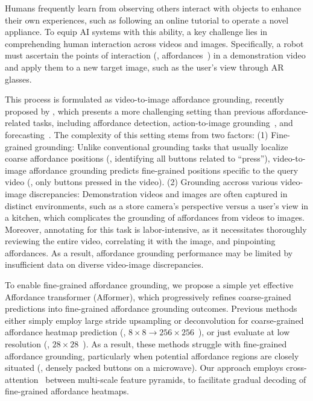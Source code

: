 \documentclass[10pt,twocolumn,letterpaper]{article}
\begin{document}
Humans frequently learn from observing others interact with objects to enhance their own experiences, such as following an online tutorial to operate a novel appliance. To equip AI systems with this ability, a key challenge lies in comprehending human interaction across videos and images. Specifically, a robot must ascertain the points of interaction (\ie, affordances~\cite{affo_survey}) in a demonstration video and apply them to a new target image, such as the user's view through AR glasses.

This process is formulated as video-to-image affordance grounding, recently proposed by \cite{demo2vec}, which presents a more challenging setting than previous affordance-related tasks, including affordance detection\cite{affonet,oneshot_affo}, action-to-image grounding~\cite{hotspot,hagnet,probes,exoaffo}, and forecasting~\cite{jointhand,nextactive,forecast_hoi}. The complexity of this setting stems from two factors: (1) Fine-grained grounding: Unlike conventional grounding tasks that usually localize coarse affordance positions (\eg, identifying all buttons related to ``press''), video-to-image affordance grounding predicts fine-grained positions specific to the query video (\eg, only buttons pressed in the video). (2) Grounding 
accross various video-image discrepancies: Demonstration videos and images are often  captured in distinct environments, such as a store camera's perspective versus a user's view in a kitchen, which complicates the grounding of affordances from videos to images. Moreover, annotating for this task is labor-intensive, as it necessitates thoroughly reviewing the entire video, correlating it with the image, and pinpointing affordances. As a result, affordance grounding performance may be limited by insufficient data on diverse video-image discrepancies.

To enable fine-grained affordance grounding, we propose a simple yet effective Affordance transformer (Afformer), which progressively refines coarse-grained predictions into fine-grained affordance grounding outcomes. Previous methods~\cite{demo2vec,hagnet,hotspot} either simply employ large stride upsampling or deconvolution for coarse-grained affordance heatmap prediction (\eg, $8\times8 \rightarrow 256\times256$~\cite{demo2vec}), or just evaluate at low resolution (\eg, $28\times28$~\cite{hotspot,hagnet}). As a result, these methods struggle with fine-grained affordance grounding, particularly when potential affordance regions are closely situated (\eg, densely packed buttons on a microwave). Our approach employs cross-attention~\cite{detr,mask2former} between multi-scale feature pyramids, to facilitate gradual decoding of fine-grained affordance heatmaps.
\end{document}
